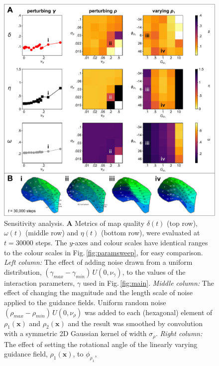 \documentclass[9pt,lineno]{elife}
\newcommand{\cmnt}[1]{\textcolor{colcmnt}{#1}}
\newcommand{\mb}[1]{\mathbf{#1}}
\begin{document}
\begin{figure}
  \begin{fullwidth}
    \includegraphics[width=\linewidth]{./Fig3.pdf}
    \caption{
      \cmnt{Sensitivity analysis.
        \textbf{A} Metrics of map quality $\delta(t)$ (top row), $\omega(t)$
        (middle row) and $\eta(t)$ (bottom row), were evaluated at $t=30000$
        steps. The $y$-axes and colour scales have identical ranges to the
        colour scales in Fig.\,\ref{fig:paramsweep}, for easy comparison.
        \emph{Left column:} The effect of adding noise drawn from a uniform
        distribution, $(\gamma_{max}-\gamma_{min})\,U(0,\nu_\gamma)$, to the
        values of the interaction parameters, $\gamma$ used in
        Fig.\,\ref{fig:main}.
        \emph{Middle column:} The effect of changing the magnitude and the
        length scale of noise applied to the guidance fields. Uniform random
        noise $(\rho_{max} - \rho_{min})\,U(0, \nu_{\rho})$ was added to each
        (hexagonal) element of $\rho_1(\mb{x})$ and $\rho_2(\mb{x})$ and the
        result was smoothed by convolution with a symmetric 2D Gaussian kernel
        of width $\sigma_\rho$.
        \emph{Right column:} The effect of setting the rotational angle of the
        linearly varying guidance field, $\rho_1(\mb{x})$, to $\phi_{\rho_1}$,
}}
\end{fullwidth}
\end{figure}
\end{document}
